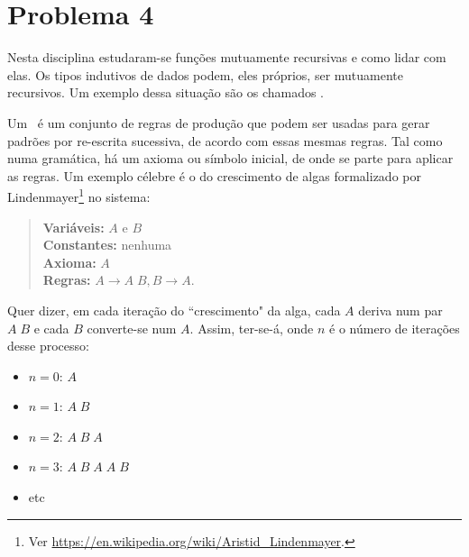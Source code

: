 \documentclass[a4paper]{article}
\newcommand{\Conid}[1]{\mathit{#1}}
\newcommand{\Varid}[1]{\mathit{#1}}
\begin{document}
\section*{Problema 4}
Nesta disciplina estudaram-se funções mutuamente recursivas e como lidar com elas.
Os tipos indutivos de dados podem, eles próprios, ser mutuamente recursivos.
Um exemplo dessa situação são os chamados \LSystems.

Um \LSystem\ é um conjunto de regras de produção que podem ser usadas para
gerar padrões por re-escrita sucessiva, de acordo com essas mesmas regras.
Tal como numa gramática, há um axioma ou símbolo inicial, de onde se parte
para aplicar as regras. Um exemplo célebre é o do crescimento de algas formalizado
por Lindenmayer\footnote{Ver \url{https://en.wikipedia.org/wiki/Aristid_Lindenmayer}.}
no sistema:
\begin{quote}
\textbf{Variáveis:} \ensuremath{\Conid{A}} e \ensuremath{\Conid{B}}
\\
\textbf{Constantes:} nenhuma
\\
\textbf{Axioma:} \ensuremath{\Conid{A}}
\\
\textbf{Regras:} \ensuremath{\Conid{A}\to \Conid{A}\;\Conid{B},\Conid{B}\to \Conid{A}}.
\end{quote}
Quer dizer, em cada iteração do ``crescimento" da alga, cada \ensuremath{\Conid{A}} deriva num par \ensuremath{\Conid{A}\;\Conid{B}} e
cada \ensuremath{\Conid{B}} converte-se num \ensuremath{\Conid{A}}. Assim, ter-se-á, onde \ensuremath{\Varid{n}} é o número de iterações
desse processo:
\begin{itemize}
\item	\ensuremath{\Varid{n}\mathrel{=}\mathrm{0}}: \ensuremath{\Conid{A}}
\item	\ensuremath{\Varid{n}\mathrel{=}\mathrm{1}}: \ensuremath{\Conid{A}\;\Conid{B}}
\item	\ensuremath{\Varid{n}\mathrel{=}\mathrm{2}}: \ensuremath{\Conid{A}\;\Conid{B}\;\Conid{A}}
\item	\ensuremath{\Varid{n}\mathrel{=}\mathrm{3}}: \ensuremath{\Conid{A}\;\Conid{B}\;\Conid{A}\;\Conid{A}\;\Conid{B}}
\item	etc
\end{itemize}
\end{document}
